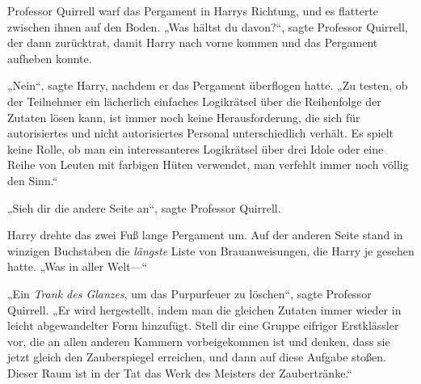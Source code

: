 Professor Quirrell warf das Pergament in Harrys Richtung, und es flatterte zwischen ihnen auf den Boden.
„Was hältst du davon?“, sagte Professor Quirrell, der dann zurücktrat, damit Harry nach vorne kommen und das Pergament aufheben konnte.

„Nein“, sagte Harry, nachdem er das Pergament überflogen hatte.
„Zu testen, ob der Teilnehmer ein lächerlich einfaches Logikrätsel über die Reihenfolge der Zutaten lösen kann, ist immer noch keine Herausforderung, die sich für autorisiertes und nicht autorisiertes Personal unterschiedlich verhält. Es spielt keine Rolle, ob man ein interessanteres Logikrätsel über drei Idole oder eine Reihe von Leuten mit farbigen Hüten verwendet, man verfehlt immer noch völlig den Sinn.“

„Sieh dir die andere Seite an“, sagte Professor Quirrell.

Harry drehte das zwei Fuß lange Pergament um.
Auf der anderen Seite stand in winzigen Buchstaben die \emph{längste} Liste von Brauanweisungen, die Harry je gesehen hatte.
„Was in aller Welt—“

„Ein \emph{Trank des Glanzes}, um das Purpurfeuer zu löschen“, sagte Professor Quirrell.
„Er wird hergestellt, indem man die gleichen Zutaten immer wieder in leicht abgewandelter Form hinzufügt. Stell dir eine Gruppe eifriger Erstklässler vor, die an allen anderen Kammern vorbeigekommen ist und denken, dass sie jetzt gleich den Zauberspiegel erreichen, und dann auf diese Aufgabe stoßen. Dieser Raum ist in der Tat das Werk des Meisters der Zaubertränke.“

